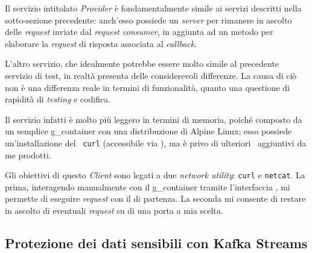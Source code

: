 Il servizio intitolato  \textit{Provider} è fondamentalmente simile ai servizi descritti nella sotto-sezione precedente: anch'esso possiede un  \textit{server} per rimanere in ascolto delle  \textit{request} inviate dal \textit{request consumer}, in aggiunta ad un metodo per elaborare la  \textit{request} di risposta associata al \textit{callback}.

L'altro servizio, che idealmente potrebbe essere molto simile al precedente servizio di test, in realtà presenta delle considerevoli differenze.
La causa di ciò non è una differenza reale in termini di funzionalità, quanto una questione di rapidità di \textit{testing} e codifica.

Il servizio infatti è molto più leggero in termini di memoria, poiché composto da un semplice \gls{g_container} con una distribuzione di Alpine Linux; esso possiede un'installazione del \software\ \texttt{curl} (accessibile via ), ma è privo di ulteriori \software\ aggiuntivi da me prodotti.

Gli obiettivi di questo  \textit{Client} sono legati a due \textit{network utility}: \texttt{curl} e \texttt{netcat}.
La prima, interagendo manualmente con il \gls{g_container} tramite l'interfaccia , mi permette di eseguire  \textit{request} con il  di partenza.
La seconda mi consente di restare in ascolto di eventuali \textit{request} su di una porta a mia scelta.


\subsection{Protezione dei dati sensibili con Kafka Streams}

